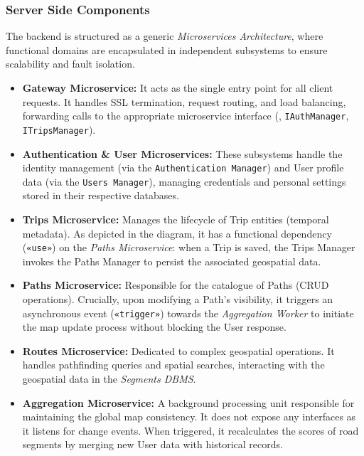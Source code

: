 \subsubsection*{Server Side Components}
The backend is structured as a generic \emph{Microservices Architecture}, where functional domains are encapsulated in independent subsystems to ensure scalability and fault isolation.
\begin{itemize}
    \item \textbf{Gateway Microservice:}
    It acts as the single entry point for all client requests. It handles SSL termination, request routing, and load balancing, forwarding calls to the appropriate microservice interface (\eg, \texttt{IAuthManager}, \texttt{ITripsManager}).

    \item \textbf{Authentication \& User Microservices:}
    These subsystems handle the identity management (via the \texttt{Authentication Manager}) and User profile data (via the \texttt{Users Manager}), managing credentials and personal settings stored in their respective databases.

    \item \textbf{Trips Microservice:}
    Manages the lifecycle of Trip entities (temporal metadata). As depicted in the diagram, it has a functional dependency (\texttt{«use»}) on the \emph{Paths Microservice}: when a Trip is saved, the Trips Manager invokes the Paths Manager to persist the associated geospatial data.

    \item \textbf{Paths Microservice:}
    Responsible for the catalogue of Paths (CRUD operations). Crucially, upon modifying a Path's visibility, it triggers an asynchronous event (\texttt{«trigger»}) towards the \emph{Aggregation Worker} to initiate the map update process without blocking the User response.

    \item \textbf{Routes Microservice:}
    Dedicated to complex geospatial operations. It handles pathfinding queries and spatial searches, interacting with the geospatial data in the \emph{Segments DBMS}.

    \item \textbf{Aggregation Microservice:}
    A background processing unit responsible for maintaining the global map consistency. It does not expose any interfaces as it listens for change events. When triggered, it recalculates the scores of road segments by merging new User data with historical records.


\end{itemize}
